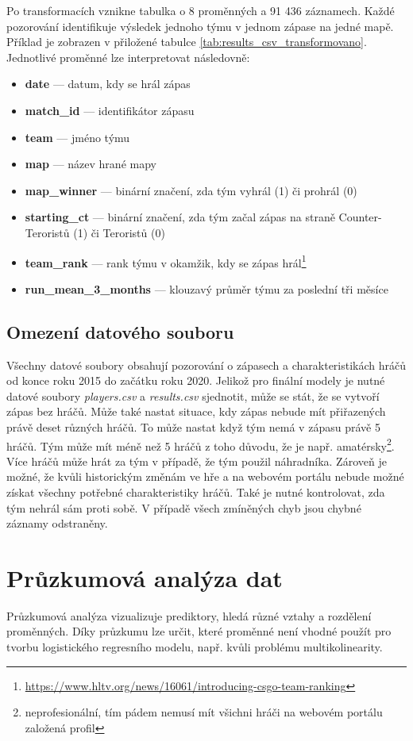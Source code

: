Po transformacích vznikne tabulka o 8 proměnných a 91 436 záznamech. Každé pozorování identifikuje výsledek jednoho týmu v jednom zápase
na jedné mapě. Příklad je zobrazen v přiložené tabulce \ref{tab:results_csv_transformovano}. Jednotlivé proměnné lze interpretovat následovně:
\begin{itemize}
    \item \textbf{date} --- datum, kdy se hrál zápas
    \item \textbf{match\_id} --- identifikátor zápasu
    \item \textbf{team} --- jméno týmu
    \item \textbf{map} --- název hrané mapy
    \item \textbf{map\_winner} --- binární značení, zda tým vyhrál (1) či prohrál (0)
    \item \textbf{starting\_ct} --- binární značení, zda tým začal zápas na straně Counter-Teroristů (1) či Teroristů (0)
    \item \textbf{team\_rank} --- rank týmu v okamžik, kdy se zápas hrál\footnote{\url{https://www.hltv.org/news/16061/introducing-csgo-team-ranking}}
    \item \textbf{run\_mean\_3\_months} --- klouzavý průměr týmu za poslední tři měsíce
\end{itemize}

\subsection{Omezení datového souboru}
{\color{red}
Všechny datové soubory obsahují pozorování o zápasech a charakteristikách hráčů od konce roku 2015 do začátku roku 2020. Jelikož pro finální modely je nutné datové soubory
\textit{players.csv} a \textit{results.csv} sjednotit, může se stát, že se vytvoří zápas bez hráčů. Může také nastat situace, kdy zápas nebude mít přiřazených právě 
deset různých hráčů. To může nastat když tým nemá v zápasu právě 5 hráčů. Tým může mít méně než 5 hráčů z toho důvodu, že je např.
amatérsky\footnote{neprofesionální, tím pádem nemusí mít všichni hráči na webovém portálu založená profil}. Více hráčů může hrát za tým v případě, že tým použil náhradníka.
Zároveň je možné, že kvůli historickým změnám ve hře a na webovém portálu nebude možné získat všechny potřebné charakteristiky hráčů. Také je nutné kontrolovat,
zda tým nehrál sám proti sobě. V případě všech zmíněných chyb jsou chybné záznamy odstraněny.
}

\section{Průzkumová analýza dat}
Průzkumová analýza vizualizuje prediktory, hledá různé vztahy a rozdělení proměnných. Díky průzkumu lze určit, které proměnné není vhodné použít pro tvorbu
logistického regresního modelu, např. kvůli problému multikolinearity.

